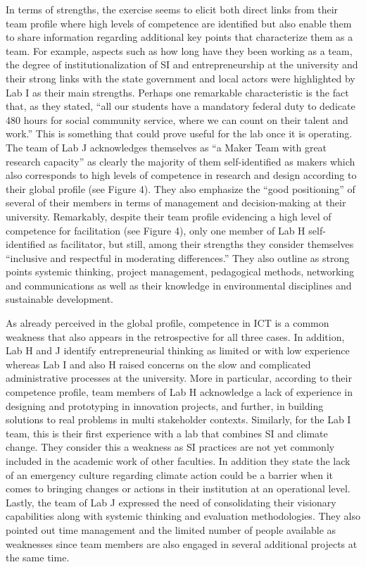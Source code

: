 \documentclass[AMA,STIX1COL,APA,STIX2COL]{WileyNJD-v2}
\begin{document}
In terms of strengths, the exercise seems to elicit both direct links
from their team profile where high levels of competence are identified
but also enable them to share information regarding additional key
points that characterize them as a team. For example, aspects such as
how long have they been working as a team, the degree of
institutionalization of SI and entrepreneurship at the university and
their strong links with the state government and local actors were
highlighted by Lab I as their main strengths. Perhaps one remarkable
characteristic is the fact that, as they stated, ``all our students have
a mandatory federal duty to dedicate 480 hours for social community
service, where we can count on their talent and work.'' This is
something that could prove useful for the lab once it is operating. The
team of Lab J acknowledges themselves as ``a Maker Team with great
research capacity'' as clearly the majority of them self-identified as
makers which also corresponds to high levels of competence in research
and design according to their global profile (see Figure 4). They also
emphasize the ``good positioning'' of several of their members in terms
of management and decision-making at their university. Remarkably,
despite their team profile evidencing a high level of competence for
facilitation (see Figure 4), only one member of Lab H self-identified as
facilitator, but still, among their strengths they consider themselves
``inclusive and respectful in moderating differences.'' They also
outline as strong points systemic thinking, project management,
pedagogical methods, networking and communications as well as their
knowledge in environmental disciplines and sustainable development.

As already perceived in the global profile, competence in ICT is a
common weakness that also appears in the retrospective for all three
cases. In addition, Lab H and J identify entrepreneurial thinking as
limited or with low experience whereas Lab I and also H raised concerns
on the slow and complicated administrative processes at the university.
More in particular, according to their competence profile, team members
of Lab H acknowledge a lack of experience in designing and prototyping
in innovation projects, and further, in building solutions to real
problems in multi stakeholder contexts. Similarly, for the Lab I team,
this is their first experience with a lab that combines SI and climate
change. They consider this a weakness as SI practices are not yet
commonly included in the academic work of other faculties. In addition
they state the lack of an emergency culture regarding climate action
could be a barrier when it comes to bringing changes or actions in their
institution at an operational level. Lastly, the team of Lab J expressed
the need of consolidating their visionary capabilities along with
systemic thinking and evaluation methodologies. They also pointed out
time management and the limited number of people available as weaknesses
since team members are also engaged in several additional projects at
the same time.
\end{document}
